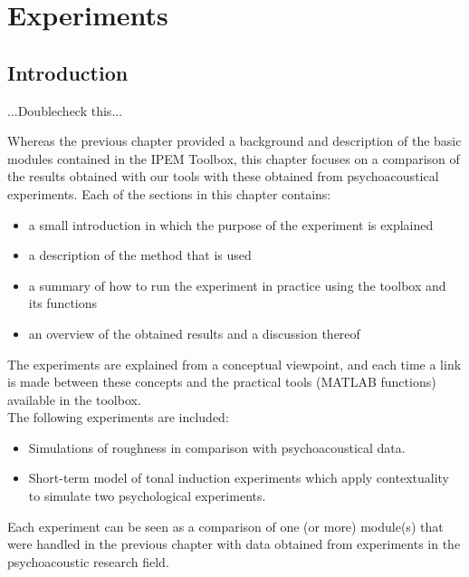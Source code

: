 
\chapter{Experiments}
\hypertarget{Chapter:ConceptsExperiments}{}

\section{Introduction}

\IPEMTBC ...Doublecheck this...

Whereas the previous chapter provided a background and description
of the basic modules contained in the IPEM Toolbox, this chapter
focuses on a comparison of the results obtained with our tools
with these obtained from psychoacoustical experiments. Each of the
sections in this chapter contains:
\begin{itemize}
\item a small introduction in which the purpose of the experiment is explained
\item a description of the method that is used
\item a summary of how to run the experiment in practice using
the toolbox and its functions
\item an overview of the obtained results and a discussion thereof
\end{itemize}
The experiments are explained from a conceptual viewpoint, and
each time a link is made between these concepts and the practical
tools (MATLAB functions) available in the toolbox.\\

The following experiments are included:
\begin{itemize}
\item Simulations of roughness in comparison with psychoacoustical data.
\item Short-term model of tonal induction experiments which apply
contextuality to simulate two psychological experiments.
\end{itemize}
Each experiment can be seen as a comparison of one (or more)
module(s) that were handled in the previous chapter with data
obtained from experiments in the psychoacoustic research field.




